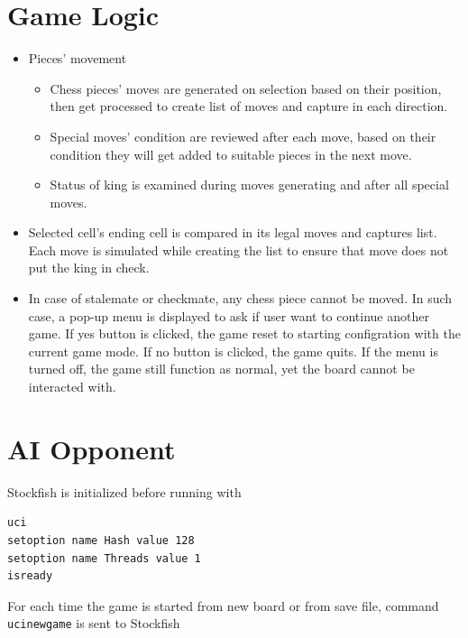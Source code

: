 \documentclass[a4paper, 10pt, titlepage]{report}
\begin{document}
\section{Game Logic}
\begin{itemize}
  \item Pieces' movement
        \begin{itemize}
          \item Chess pieces' moves are generated on selection based on their position, then get processed to create list of moves and capture in each direction.
          \item Special moves' condition are reviewed after each move, based on their condition they will get added to suitable pieces in the next move.
          \item Status of king is examined during moves generating and after all special moves.
        \end{itemize}
  \item Selected cell's ending cell is compared in its legal moves and captures list. Each move is simulated while creating the list to ensure that move does not put the king in check.
  \item In case of stalemate or checkmate, any chess piece cannot be moved. In such case, a pop-up menu is displayed to ask if user want to continue another game. If yes button is clicked, the game reset to starting configration with the current game mode. If no button is clicked, the game quits. If the menu is turned off, the game still function as normal, yet the board cannot be interacted with.
\end{itemize}
\section{AI Opponent}
Stockfish is initialized before running with
\begin{verbatim}
uci
setoption name Hash value 128
setoption name Threads value 1
isready
\end{verbatim}

For each time the game is started from new board or from save file, command \texttt{ucinewgame} is sent to Stockfish
\end{document}
